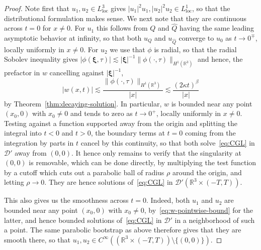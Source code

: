 \documentclass[11pt]{article}
\begin{document}
\begin{proof}
  Note first that \(u_{1}, u_{2} \in L_{\text{loc}}^{3}\) gives
  \(|u_{1}|^{2}u_{1}, |u_{2}|^{2}u_{2} \in L_{\text{loc}}^{1}\), so
  that the distributional formulation makes sense. We next note that
  they are continuous across \(t = 0\) for \(x \neq 0\). For \(u_{1}\)
  this follows from \(Q\) and \(\hat{Q}\) having the same leading
  asymptotic behavior at infinity, so that both \(u_{Q}\) and
  \(u_{\hat{Q}}\) converge to \(u_{0}\) as \(t \to 0^{\mp}\), locally
  uniformly in \(x \neq 0\). For \(u_{2}\) we use that \(\phi\) is
  radial, so that the radial Sobolev inequality gives
  \(|\phi(\bm{\xi}, \tau)| \lesssim |\bm{\xi}|^{-1}\|\phi(\cdot,
  \tau)\|_{H^{1}(\mathbb{R}^{3})}\) and hence, the prefactor in \(w\)
  cancelling against \(|\bm{\xi}|^{-1}\),
  \begin{equation}\label{eq:w-pointwise-bound}
    |w(x, t)| \lesssim \frac{\|\phi(\cdot, \tau)\|_{H^{1}(\mathbb{R}^{3})}}{|x|}
    \lesssim \frac{(2\kappa t)^{\beta}}{|x|}
  \end{equation}
  by Theorem~\ref{thm:decaying-solution}. In particular, \(w\) is
  bounded near any point \((x_{0}, 0)\) with \(x_{0} \neq 0\) and
  tends to zero as \(t \to 0^{+}\), locally uniformly in
  \(x \neq 0\). Testing against a function supported away from the
  origin and splitting the integral into \(t < 0\) and \(t > 0\), the
  boundary terms at \(t = 0\) coming from the integration by parts in
  \(t\) cancel by this continuity, so that both solve~\eqref{eq:CGL}
  in \(\mathcal{D}'\) away from \((0, 0)\). It hence only remains to
  verify that the singularity at \((0, 0)\) is removable, which can be
  done directly, by multiplying the test function by a cutoff which
  cuts out a parabolic ball of radius \(\rho\) around the origin, and
  letting \(\rho \to 0\). They are hence solutions of~\eqref{eq:CGL}
  in \(\mathcal{D}'(\mathbb{R}^{3} \times (-T, T))\).

  This also gives us the smoothness across \(t = 0\). Indeed, both
  \(u_{1}\) and \(u_{2}\) are bounded near any point \((x_{0}, 0)\)
  with \(x_{0} \neq 0\), by~\eqref{eq:w-pointwise-bound} for the
  latter, and hence bounded solutions of~\eqref{eq:CGL} in
  \(\mathcal{D}'\) in a neighborhood of such a point. The same
  parabolic bootstrap as above therefore gives that they are smooth
  there, so that
  \(u_{1}, u_{2} \in C^{\infty}((\mathbb{R}^{3} \times (-T, T))
  \setminus \{(0, 0)\})\).


\end{proof}
\end{document}

